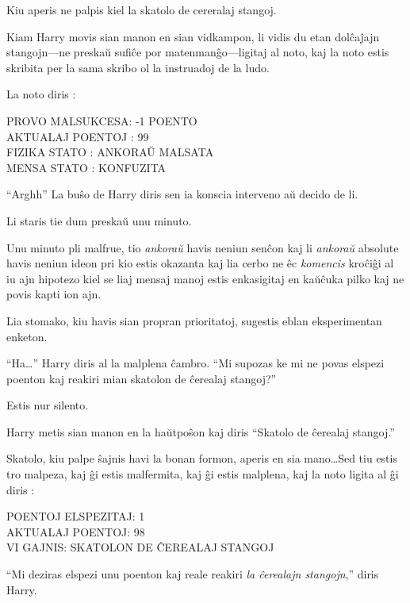 Kiu aperis ne palpis kiel la skatolo de cereralaj stangoj.

Kiam Harry movis sian manon en sian vidkampon, li vidis du etan
dolĉaĵajn stangojn—ne preskaŭ sufiĉe por matenmanĝo—ligitaj al noto, kaj
la noto estis skribita per la sama skribo ol la instruadoj de la ludo.

La noto diris :
\medskip

\begin{center}
  PROVO MALSUKCESA: -1 POENTO\\
  AKTUALAJ POENTOJ : 99\\
  FIZIKA STATO : ANKORAŬ MALSATA\\
  MENSA STATO : KONFUZITA\\
\end{center}

\medskip

``Arghh'' La buŝo de Harry diris sen ia konscia interveno aŭ decido de
li.

Li staris tie dum preskaŭ unu minuto.

Unu minuto pli malfrue, tio \emph{ankoraŭ} havis neniun senĉon kaj li
\emph{ankoraŭ} absolute havis neniun ideon pri kio estis okazanta kaj
lia cerbo ne êc \emph{komencis} kroĉiĝi al iu ajn hipotezo kiel se
liaj mensaj manoj estis enkasigitaj en kaŭĉuka pilko kaj ne povis
kapti ion ajn.  

Lia stomako, kiu havis sian propran prioritatoj, sugestis eblan
eksperimentan enketon.

``Ha\ldots'' Harry diris al la malplena ĉambro. ``Mi supozas ke mi ne
povas elspezi poenton kaj reakiri mian skatolon de ĉerealaj stangoj?''

Estis nur silento.

Harry metis sian manon en la haŭtpoŝon kaj diris ``Skatolo de ĉerealaj stangoj.''

Skatolo, kiu palpe ŝajnis havi la bonan formon, aperis en sia
mano\ldots Sed tiu estis tro malpeza, kaj ĝi estis malfermita, kaj ĝi
estis malplena, kaj la noto ligita al ĝi diris :

\medskip
\begin{center}
  POENTOJ ELSPEZITAJ: 1\\
  AKTUALAJ POENTOJ: 98\\
  VI GAJNIS: SKATOLON DE ĈEREALAJ STANGOJ\\
\end{center}

``Mi deziras elspezi unu poenton kaj reale reakiri \emph{la ĉerealajn
stangojn},'' diris Harry.

